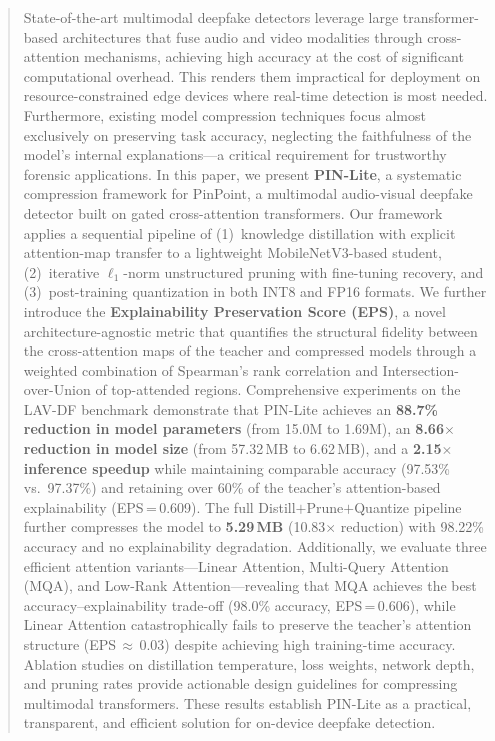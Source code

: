 \documentclass[lettersize,journal]{IEEEtran}
\begin{document}
\begin{abstract}
State-of-the-art multimodal deepfake detectors leverage large transformer-based architectures that fuse audio and video modalities through cross-attention mechanisms, achieving high accuracy at the cost of significant computational overhead. This renders them impractical for deployment on resource-constrained edge devices where real-time detection is most needed. Furthermore, existing model compression techniques focus almost exclusively on preserving task accuracy, neglecting the faithfulness of the model's internal explanations---a critical requirement for trustworthy forensic applications. In this paper, we present \textbf{PIN-Lite}, a systematic compression framework for PinPoint, a multimodal audio-visual deepfake detector built on gated cross-attention transformers. Our framework applies a sequential pipeline of (1)~knowledge distillation with explicit attention-map transfer to a lightweight MobileNetV3-based student, (2)~iterative $\ell_1$-norm unstructured pruning with fine-tuning recovery, and (3)~post-training quantization in both INT8 and FP16 formats. We further introduce the \textbf{Explainability Preservation Score (EPS)}, a novel architecture-agnostic metric that quantifies the structural fidelity between the cross-attention maps of the teacher and compressed models through a weighted combination of Spearman's rank correlation and Intersection-over-Union of top-attended regions. Comprehensive experiments on the LAV-DF benchmark demonstrate that PIN-Lite achieves an \textbf{88.7\% reduction in model parameters} (from 15.0M to 1.69M), an \textbf{8.66$\times$ reduction in model size} (from 57.32\,MB to 6.62\,MB), and a \textbf{2.15$\times$ inference speedup} while maintaining comparable accuracy (97.53\% vs.\ 97.37\%) and retaining over 60\% of the teacher's attention-based explainability (EPS\,=\,0.609). The full Distill$+$Prune$+$Quantize pipeline further compresses the model to \textbf{5.29\,MB} (10.83$\times$ reduction) with 98.22\% accuracy and no explainability degradation. Additionally, we evaluate three efficient attention variants---Linear Attention, Multi-Query Attention (MQA), and Low-Rank Attention---revealing that MQA achieves the best accuracy--explainability trade-off (98.0\% accuracy, EPS\,=\,0.606), while Linear Attention catastrophically fails to preserve the teacher's attention structure (EPS\,$\approx$\,0.03) despite achieving high training-time accuracy. Ablation studies on distillation temperature, loss weights, network depth, and pruning rates provide actionable design guidelines for compressing multimodal transformers. These results establish PIN-Lite as a practical, transparent, and efficient solution for on-device deepfake detection.
\end{abstract}
\end{document}
